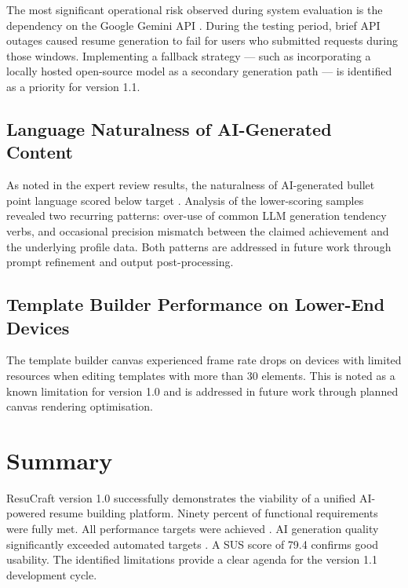 \documentclass[12pt, a4paper, oneside]{report}
\begin{document}
The most significant operational risk observed during system evaluation is the dependency on the Google Gemini API \cite{geminidocs2024}. During the testing period, brief API outages caused resume generation to fail for users who submitted requests during those windows. Implementing a fallback strategy --- such as incorporating a locally hosted open-source model as a secondary generation path --- is identified as a priority for version 1.1.

\subsection{Language Naturalness of AI-Generated Content}

As noted in the expert review results, the naturalness of AI-generated bullet point language scored below target \cite{brown2020}. Analysis of the lower-scoring samples revealed two recurring patterns: over-use of common LLM generation tendency verbs, and occasional precision mismatch between the claimed achievement and the underlying profile data. Both patterns are addressed in future work through prompt refinement and output post-processing.

\subsection{Template Builder Performance on Lower-End Devices}

The template builder canvas experienced frame rate drops on devices with limited resources when editing templates with more than 30 elements. This is noted as a known limitation for version 1.0 and is addressed in future work through planned canvas rendering optimisation.

\section{Summary}

ResuCraft version 1.0 successfully demonstrates the viability of a unified AI-powered resume building platform. Ninety percent of functional requirements were fully met. All performance targets were achieved \cite{k62024}. AI generation quality significantly exceeded automated targets \cite{qin2018}. A SUS score of 79.4 \cite{sus1996} confirms good usability. The identified limitations provide a clear agenda for the version 1.1 development cycle.

\end{document}

